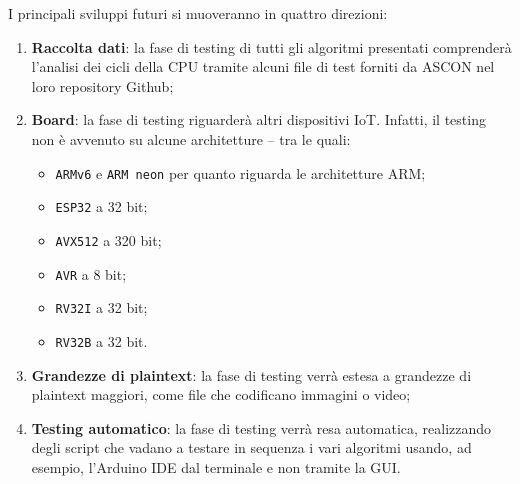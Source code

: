 I principali sviluppi futuri si muoveranno in quattro direzioni:
\begin{enumerate}[label=\Roman*.]
    \item \textbf{Raccolta dati}: la fase di testing di tutti gli algoritmi presentati comprenderà l'analisi dei cicli della CPU tramite alcuni file di test forniti da ASCON nel loro repository Github\cite{github};
    \item \textbf{Board}: la fase di testing riguarderà altri dispositivi IoT. Infatti, il testing non è avvenuto su alcune architetture – tra le quali:
    \begin{itemize}
        \item \texttt{ARMv6} e \texttt{ARM neon} per quanto riguarda le architetture ARM;
        \item \texttt{ESP32} a 32 bit;
        \item \texttt{AVX512} a 320 bit;
        \item \texttt{AVR} a 8 bit;
        \item \texttt{RV32I} a 32 bit;
        \item \texttt{RV32B} a 32 bit.
    \end{itemize}
    \item \textbf{Grandezze di plaintext}: la fase di testing verrà estesa a grandezze di plaintext maggiori, come file che codificano immagini o video;
    \item \textbf{Testing automatico}: la fase di testing verrà resa automatica, realizzando degli script che vadano a testare in sequenza i vari algoritmi usando, ad esempio, l'Arduino IDE dal terminale e non tramite la GUI.
\end{enumerate}
